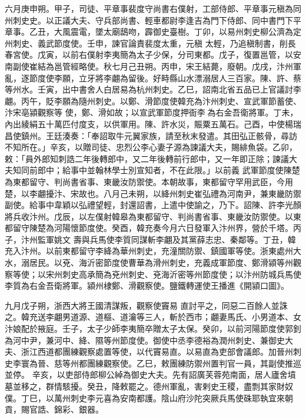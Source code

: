 \begin{pinyinscope}
 六月庚申朔。甲子，司徒、平章事裴度守尚書右僕射，工部侍郎、平章事元稹為同州刺史史。以正議大夫、守兵部尚書、輕車都尉李逢吉為門下侍郎、同中書門下平章事。乙丑，大風震電，墜太廟鴟吻，霹御史臺樹。丁卯，以易州刺史柳公濟為定州刺史、義武節度使。壬申，諫官論責裴度太重，元稹
 太輕，乃追稹制書，削長春宮使。戊寅，以前右僕射李夷簡為太子少保，分司東都。戊子，復置邕管，以安南副使崔結為邕管經略使。秋七月己丑朔。丙申，宋王結薨，廢朝。戊戌，汴州軍亂，逐節度使李願，立牙將李翽為留後。好畤縣山水漂溺居人三百家。陳、許、蔡等州水。壬寅，出中書舍人白居易為杭州刺史。乙巳，詔南北省五品已上官議討李翽。丙午，貶李願為隨州刺史。以鄭、滑節度使韓充為汴州刺史、宣武軍節蓄使、汴宋亳潁觀察等
 使，鄭、滑如故；以宣武軍節度押衙李為右金吾衛將軍。丁未，內出綾絹五十萬匹付度支，以供軍用。陳、許水災，賑粟五萬石。己酉，中使楊瑞昌使鎮州。王廷湊奏：「奉詔取牛元翼家族，請至秋末發遣。其田弘正骸骨，尋訪不知所在。」辛亥，以贈司徒、忠烈公李心妻子源為諫議大夫，賜緋魚袋。乙卯，敕：「員外郎知刺誥二年後轉郎中，又二年後轉前行郎中，又一年即正除；諫議大夫知同前郎中；給事中並翰林學士別宣知者，不在此限。」以前義
 武軍節度使陳楚為東都留守、判尚書省事、東畿汝防禦使。本朝故事，東都留守罕用武臣，今用楚，以李翽擾汴、宋故也。八月己未朔，以絳州刺史崔弘禮為河南尹，兼東畿防禦副使。給事中韋穎以弘禮望輕，封還詔書，上遣中使諭之，乃下。詔陳、許李光顏將兵收汴州。戊辰，以左僕射韓皋為東都留守、判尚書省事、東畿汝防禦使。以東都留守陳楚為河陽懷節度使。癸酉，韓充奏今月六日發軍入汴州界，營於千塔。丙子，汴州監軍姚文
 壽與兵馬使李質同謀斬李翽及其黨薛志忠、秦鄰等。丁丑，韓充入汴州。以前東都留守李絳為華州刺史，充潼關防禦、鎮國軍等使。浙東處州大水，溺居民。以兗、海沂密節度使曹華為滑州刺史，充義成軍節度、鄭滑潁等州觀察等使；以宋州刺史高承簡為兗州刺史、兗海沂密等州節度使；以汴州防城兵馬使李質為右金吾衛將軍。潁州棣鄭、滑觀察使。鹽鐵轉運使王播進《開潁口圖》。



 九月戊子朔，浙西大將王國清謀叛，觀察使竇易
 直討平之，同惡二百餘人並誅之。韓充送李翽男道源、道樞、道瀹等三人，斬於西市；翽妻馬氏、小男道本、女汴娘配於掖庭。壬子，太子少師李夷簡卒贈太子太保。癸卯，以前河陽節度使郭釗為河中尹，兼河中、絳、隰等州節度使。御使中丞李德裕為潤州刺史、兼御史大夫、浙江西道都團練觀察處置等使，以代竇易直。以易直為吏部會議郎。加晉州刺史李寰為晉、慈等州都團練觀察使。乙巳，敕團練防禦州置判官一員，其副使推巡並停。
 辛亥，以吏部侍郎柳公綽為御史大夫。先有詔廣芙蓉苑南面，居人廬舍墳墓並移之，群情駭擾。癸丑，降敕罷之。德州軍亂，害剌史王稷，盡剽其家財奴僕。丁巳，以萬州刺史李元喜為安南都護。陰山府沙陀突厥兵馬使硃耶執宜來朝貢，賜官誥、錦彩、銀器。




\end{pinyinscope}
